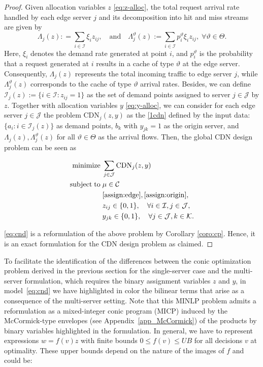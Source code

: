 \documentclass[a4paper,11pt,reqno]{amsart}
\DeclareMathOperator*{\minimize}{minimize}
\DeclareMathOperator{\st}{subject\; to}
\newcommand{\K}{\mathcal{K}}
\newcommand{\I}{\mathcal{I}}
\newcommand{\J}{\mathcal{J}}
\begin{document}
\begin{proof}
Given allocation variables $z$ \eqref{eq:z-alloc}, the total request arrival rate handled by each edge server $j$ and its decomposition into hit and miss streams are given by
$$
\Lambda_j(z): = \sum_{i \in \I} \xi_i z_{ij}, \quad \text{and}\quad \Lambda_j^\vartheta(z) := \sum_{i \in \I} p_i^\vartheta \xi_i z_{ij}, \; \forall \vartheta\in \Theta.
$$
Here, $\xi_i$ denotes the demand rate generated at point $i$, and $p_i^\vartheta$ is the probability that a request generated at $i$ results in a cache of type $\vartheta$ at the edge server. Consequently, $\Lambda_j(z)$ represents the total incoming traffic to edge server $j$, while $\Lambda_j^\vartheta(z)$  corresponds to the cache of type $\vartheta$ arrival rates. Besides, we can define $\I_j(z):=\{i\in \I : z_{ij}=1\}$ as the set of demand points assigned to server $j \in \J$ by $z$. Together with allocation variables $y$ \eqref{eq:y-alloc}, we can consider for each edge server $j\in\J$ the problem {\rm CDN}$_j(z,y)$ as the \eqref{1cdn} defined by the input data: $\{a_i : i\in \I_j(z)\}$ as demand points, $b_k$ with $y_{jk}=1$ as the origin server, and $\Lambda_j(z),\Lambda_j^\vartheta(z)$ for all $\vartheta\in\Theta$ as the arrival flows. Then, the global CDN design problem can be seen as 

\begin{align*}
    \minimize \; & \sum_{j\in\J} {\rm CDN}_j(z,y)\\
    \st \; & \mu \in \mathcal{C}\\
    & \eqref{assign:edge}, \eqref{assign:origin},\\
    & z_{ij} \in \{0,1\}, \quad \forall i \in \I, j \in \J,\\
   & y_{jk} \in \{0,1\}, \quad \forall j \in \J, k \in \K.
\end{align*}

\eqref{eq:cnd} is a reformulation of the above problem by Corollary \ref{coro:cp}. Hence, it is an exact formulation for the CDN design problem as claimed.


\end{proof}
To facilitate the identification of the differences between the conic optimization problem derived in the previous section for the single-server case and the multi-server formulation, which requires the binary assignment variables $z$ and $y$, in model~\eqref{eq:cnd} we have highlighted in color the bilinear terms that arise as a consequence of the multi-server setting. Note that this {\rm MINLP} problem admits a reformulation as a mixed-integer conic program (MICP) induced by the McCormick-type envelopes (see Appendix~\ref{app_McCormick}) of the products by binary variables highlighted in the formulation. In general, we have to represent expressions $w=f(v)z$ with finite bounds $0\leq f(v)\leq UB$ for all decisions $v$ at optimality. These upper bounds depend on the nature of the images of $f$ and could be:
\end{document}
